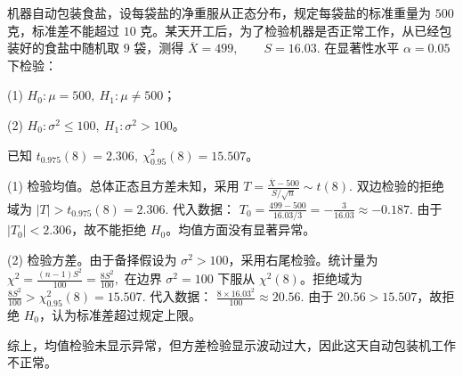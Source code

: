 \documentclass[lang=cn,11pt]{elegantbook}
\begin{document}
\begin{exercise}\label{exer:src-paper3-iv-06}\label{prob:p3-iv-06}
机器自动包装食盐，设每袋盐的净重服从正态分布，规定每袋盐的标准重量为 \(500\) 克，标准差不能超过 \(10\) 克。某天开工后，为了检验机器是否正常工作，从已经包装好的食盐中随机取 \(9\) 袋，测得
\(
\overline X=499,\qquad S=16.03.
\)
在显著性水平 \(\alpha=0.05\) 下检验：\par
(1) \(H_0\colon \mu=500,\ H_1\colon \mu\ne500\)；\par
(2) \(H_0\colon \sigma^2\le100,\ H_1\colon \sigma^2>100\)。\par
已知 \(t_{0.975}(8)=2.306,\ \chi^2_{0.95}(8)=15.507\)。
\end{exercise}
\begin{solution}
(1) 检验均值。总体正态且方差未知，采用
\(
T=\frac{\overline X-500}{S/\sqrt n}\sim t(8).
\)
双边检验的拒绝域为
\(
|T|>t_{0.975}(8)=2.306.
\)
代入数据：
\(
T_0=\frac{499-500}{16.03/3}
=-\frac3{16.03}
\approx -0.187.
\)
由于 \(|T_0|<2.306\)，故不能拒绝 \(H_0\)。均值方面没有显著异常。

(2) 检验方差。由于备择假设为 \(\sigma^2>100\)，采用右尾检验。统计量为
\(
\chi^2=\frac{(n-1)S^2}{100}
=\frac{8S^2}{100},
\)
在边界 \(\sigma^2=100\) 下服从 \(\chi^2(8)\)。拒绝域为
\(
\frac{8S^2}{100}>\chi^2_{0.95}(8)=15.507.
\)
代入数据：
\(
\frac{8\times16.03^2}{100}
\approx20.56.
\)
由于 \(20.56>15.507\)，故拒绝 \(H_0\)，认为标准差超过规定上限。

综上，均值检验未显示异常，但方差检验显示波动过大，因此这天自动包装机工作不正常。
\end{solution}
\end{document}
